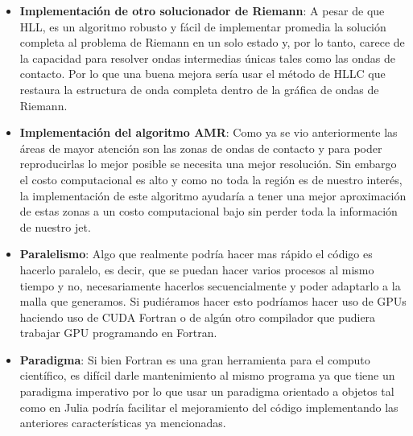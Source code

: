 \documentclass[12pt,a4paper]{book}
\begin{document}
\begin{itemize}
\item \textbf{Implementación de otro solucionador de Riemann}: A pesar de que HLL, es un algoritmo robusto y fácil de implementar promedia la solución completa al problema de Riemann en un solo estado y, por lo tanto, carece de la capacidad para resolver ondas intermedias únicas tales como las ondas de contacto. Por lo que una buena mejora sería usar el método de HLLC que restaura la estructura de onda completa dentro de la gráfica de ondas de Riemann.

\item \textbf{Implementación del algoritmo AMR}: Como ya se vio anteriormente las áreas de mayor atención son las zonas de ondas  de contacto y para poder reproducirlas lo mejor posible se necesita una mejor resolución. Sin embargo el costo computacional es alto y como no toda la región es de nuestro interés, la implementación de este algoritmo ayudaría a tener una mejor aproximación de estas zonas a un costo computacional bajo sin perder toda la información de nuestro jet.

\item \textbf{Paralelismo}: Algo que realmente podría hacer mas  rápido el código es hacerlo paralelo, es decir, que se puedan hacer varios procesos al mismo tiempo y no, necesariamente hacerlos secuencialmente y poder adaptarlo a la malla que generamos. Si pudiéramos hacer esto podríamos hacer uso de GPUs haciendo uso de CUDA Fortran o de algún otro compilador que pudiera trabajar GPU programando en Fortran.

\item \textbf{Paradigma}: Si bien Fortran es una gran herramienta para el computo científico, es difícil darle mantenimiento al mismo programa ya que tiene un paradigma imperativo por lo que usar un paradigma orientado a objetos tal como en Julia podría facilitar el mejoramiento del código implementando las anteriores características ya mencionadas.




\end{itemize}
\end{document}
